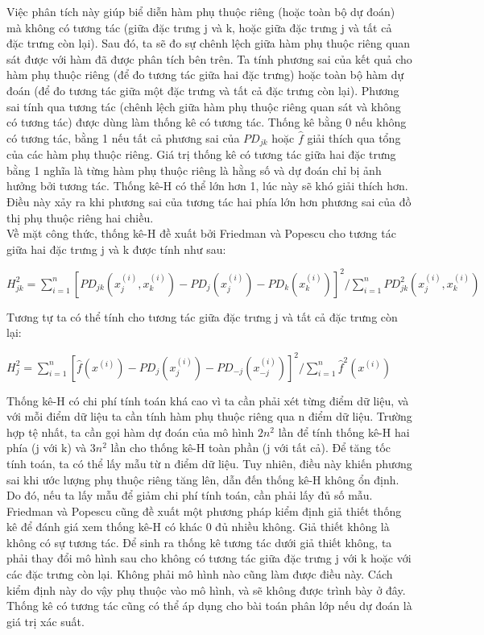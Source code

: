 Việc phân tích này giúp biể diễn hàm phụ thuộc riêng (hoặc toàn bộ dự đoán) mà không có tương tác (giữa đặc trưng j và k, hoặc giữa đặc trưng j và tất cả đặc trưng còn lại). Sau đó, ta sẽ đo sự chênh lệch giữa hàm phụ thuộc riêng quan sát được với hàm đã được phân tích bên trên. Ta tính phương sai của kết quả cho hàm phụ thuộc riêng (để đo tương tác giữa hai đặc trưng) hoặc toàn bộ hàm dự đoán (để đo tương tác giữa một đặc trưng và tất cả đặc trưng còn lại). Phương sai tính qua tương tác (chênh lệch giữa hàm phụ thuộc riêng quan sát và không có tương tác) được dùng làm thống kê có tương tác. Thống kê bằng 0 nếu không có tương tác, bằng 1 nếu tất cả phương sai của $PD_{jk}$ hoặc $\hat{f}$ giải thích qua tổng của các hàm phụ thuộc riêng. Giá trị thống kê có tương tác giữa hai đặc trưng bằng 1 nghĩa là từng hàm phụ thuộc riêng là hằng số và dự đoán chỉ bị ảnh hưởng bởi tương tác. Thống kê-H có thể lớn hơn 1, lúc này sẽ khó giải thích hơn. Điều này xảy ra khi phương sai của tương tác hai phía lớn hơn phương sai của đồ thị phụ thuộc riêng hai chiều.\\
Về mặt công thức, thống kê-H đề xuất bởi Friedman và Popescu cho tương tác giữa hai đặc trưng j và k được tính như sau:\\
\begin{center}
    $H^2_{jk}=\sum_{i=1}^n\left[PD_{jk}(x_{j}^{(i)},x_k^{(i)})-PD_j(x_j^{(i)})-PD_k(x_{k}^{(i)})\right]^2/\sum_{i=1}^n{PD}^2_{jk}(x_j^{(i)},x_k^{(i)})$
\end{center}
Tương tự ta có thể tính cho tương tác giữa đặc trưng j và tất cả đặc trưng còn lại:\\
\begin{center}
    $H^2_{j}=\sum_{i=1}^n\left[\hat{f}(x^{(i)})-PD_j(x_j^{(i)})-PD_{-j}(x_{-j}^{(i)})\right]^2/\sum_{i=1}^n\hat{f}^2(x^{(i)})$
\end{center}
Thống kê-H có chi phí tính toán khá cao vì ta cần phải xét từng điểm dữ liệu, và với mỗi điểm dữ liệu ta cần tính hàm phụ thuộc riêng qua n điểm dữ liệu. Trường hợp tệ nhất, ta cần gọi hàm dự đoán của mô hình $2n^2$ lần để tính thống kê-H hai phía (j với k) và $3n^2$ lần cho thống kê-H toàn phần (j với tất cả). Để tăng tốc tính toán, ta có thể lấy mẫu từ n điểm dữ liệu. Tuy nhiên, điều này khiến phương sai khi ước lượng phụ thuộc riêng tăng lên, dẫn đến thống kê-H không ổn định. Do đó, nếu ta lấy mẫu để giảm chi phí tính toán, cần phải lấy đủ số mẫu.\\
Friedman và Popescu cũng đề xuất một phương pháp kiểm định giả thiết thống kê để đánh giá xem thống kê-H có khác 0 đủ nhiều không. Giả thiết không là không có sự tương tác. Để sinh ra thống kê tương tác dưới giả thiết không, ta phải thay đổi mô hình sau cho không có tương tác giữa đặc trưng j với k hoặc với các đặc trưng còn lại. Không phải mô hình nào cũng làm được điều này. Cách kiểm định này do vậy phụ thuộc vào mô hình, và sẽ không được trình bày ở đây.\\
Thống kê có tương tác cũng có thể áp dụng cho bài toán phân lớp nếu dự đoán là giá trị xác suất.
